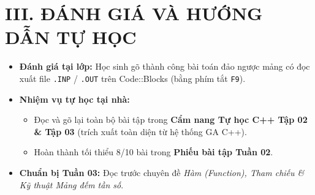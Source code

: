 \documentclass[11pt,a4paper]{article}
\begin{document}
\section*{\color{AsianDarkBlue}III. ĐÁNH GIÁ VÀ HƯỚNG DẪN TỰ HỌC}
\begin{itemize}
    \setlength{\itemsep}{2pt}
    \item \textbf{Đánh giá tại lớp:} Học sinh gõ thành công bài toán đảo ngược mảng có đọc xuất file \texttt{.INP} / \texttt{.OUT} trên Code::Blocks (bằng phím tắt \texttt{F9}).
    \item \textbf{Nhiệm vụ tự học tại nhà:}
    \begin{itemize}
        \item Đọc và gõ lại toàn bộ bài tập trong \textbf{Cẩm nang Tự học C++ Tập 02 \& Tập 03} (trích xuất toàn diện từ hệ thống GA C++).
        \item Hoàn thành tối thiểu 8/10 bài trong \textbf{Phiếu bài tập Tuần 02}.
    \end{itemize}
    \item \textbf{Chuẩn bị Tuần 03:} Đọc trước chuyên đề \textit{Hàm (Function), Tham chiếu \& Kỹ thuật Mảng đếm tần số}.
\end{itemize}
\end{document}
